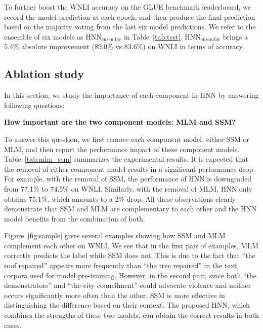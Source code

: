 \documentclass[11pt,a4paper]{article}
\newcommand{\nmodel}{HNN}
\begin{document}
To further boost the WNLI accuracy on the GLUE benchmark leaderboard, we record the model prediction at each epoch, and then produce the final prediction based on the majority voting from the last six model predictions. 
We refer to the ensemble of six models as {\nmodel}$_{\text{ensemble}}$ in Table~\ref{tab:test}. {\nmodel}$_{\text{ensemble}}$ brings a 5.4\% absolute improvement (89.0\% vs 83.6\%) on WNLI in terms of accuracy. 







\subsection{Ablation study}

In this section, we study the importance of each component in {\nmodel} by answering following questions: 

\noindent \textbf{How important are the two component models: MLM and SSM?}

To answer this question, we first remove each component model, either SSM or MLM, and then report the performance impact of these component models. 
Table~\ref{tab:mlm_ssm} summarizes the experimental results. It is expected that the removal of either component model results in a significant performance drop. 
For example, with the removal of SSM, the performance of {\nmodel} is downgraded from 77.1\% to 74.5\% on WNLI. Similarly, with the removal of MLM, {\nmodel} only obtains 75.1\%, which amounts to a 2\% drop. All these observations clearly demonstrate that SSM and MLM are complementary to each other and the {\nmodel} model benefits from the combination of both. 

Figure~\ref{fig:sample} gives several examples showing how SSM and MLM complement each other on WNLI. We see that in the first pair of examples, MLM correctly predicts the label while SSM does not. This is due to the fact that ``the roof repaired'' appears more frequently  than ``the tree repaired'' in the text corpora used for model pre-training. 
However, in the second pair, since both ``the demonstrators'' and ``the city councilment'' could advocate violence and neither occurs significantly more often than the other,  SSM is more effective in distinguishing the difference based on their context. 
The proposed HNN, which combines the strengths of these two models, can obtain the correct results in both cases.
\end{document}
